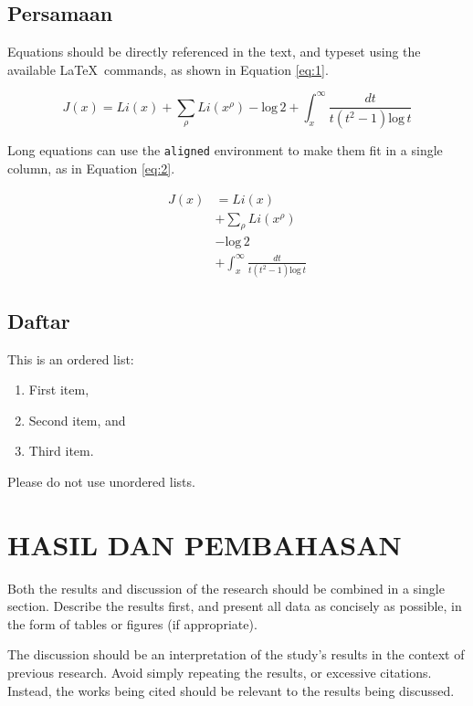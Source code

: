 \documentclass[twocolumn,twoside]{base/jrekpros}
\begin{document}
\subsection{Persamaan}

Equations should be directly referenced in the text, and typeset using the available \LaTeX\, commands, as shown in Equation \ref{eq:1}.

\begin{equation}
    J(x) = Li(x) + \sum_\rho Li(x^\rho) - \text{log}\,2 + \int^\infty_x \frac{dt}{t(t^2 - 1) \text{log}\,t}
    \label{eq:1}
\end{equation}

\noindent Long equations can use the \verb|aligned| environment to make them fit in a single column, as in Equation \ref{eq:2}.

\begin{equation}
    \begin{aligned}
        J(x) &= Li(x)\\ &+ \sum_\rho Li(x^\rho)\\ &- \text{log}\,2\\ &+ \int^\infty_x \frac{dt}{t(t^2 - 1) \text{log}\,t}
    \end{aligned}
    \label{eq:2}
\end{equation}

\subsection{Daftar}

This is an ordered list:

\begin{enumerate}
    \item First item,
    \item Second item, and
    \item Third item.
\end{enumerate}

\noindent Please do not use unordered lists.

\section{HASIL DAN PEMBAHASAN}

Both the results and discussion of the research should be combined in a single section. Describe the results first, and present all data as concisely as possible, in the form of tables or figures (if appropriate). 

The discussion should be an interpretation of the study's results in the context of previous research. Avoid simply repeating the results, or excessive citations. Instead, the works being cited should be relevant to the results being discussed.
\end{document}

